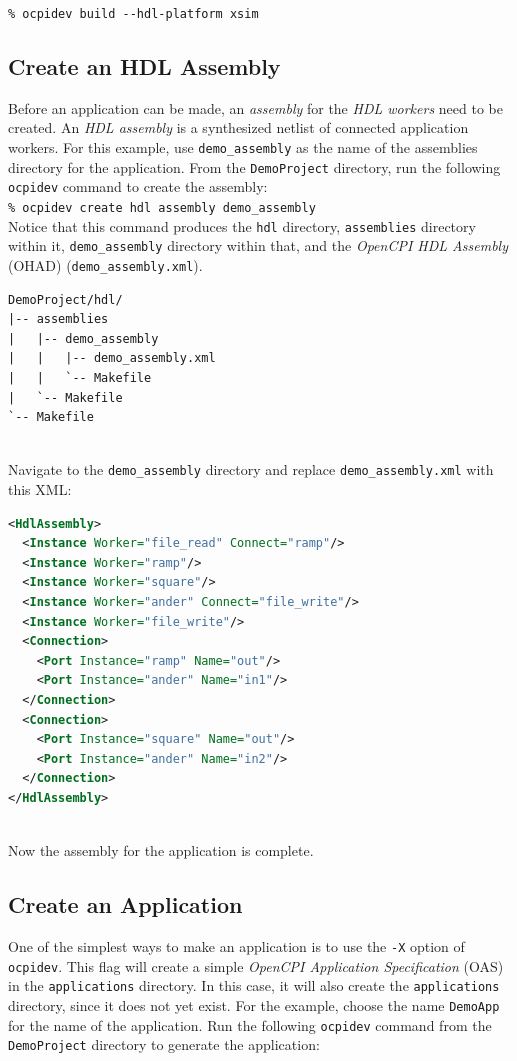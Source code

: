 \forceindent\verb+% ocpidev build --hdl-platform xsim+

\subsection{Create an HDL Assembly}
Before an application can be made, an \textit{assembly} for the \textit{HDL workers} need to be created. An \textit{HDL assembly} is a synthesized netlist of connected application workers. For this example, use \verb+demo_assembly+ as the name of the assemblies directory for the application. From the \verb+DemoProject+ directory, run the following \verb+ocpidev+ command to create the assembly:\\

\forceindent\verb+% ocpidev create hdl assembly demo_assembly+\\
\bstart
Notice that this command produces the \verb+hdl+ directory, \verb+assemblies+ directory within it, \verb+demo_assembly+ directory within that, and the \textit{OpenCPI HDL Assembly} (OHAD) (\verb+demo_assembly.xml+).

\begin{verbatim}
DemoProject/hdl/
|-- assemblies
|   |-- demo_assembly
|   |   |-- demo_assembly.xml
|   |   `-- Makefile
|   `-- Makefile
`-- Makefile
\end{verbatim}
\bend
\pagebreak[1]
~\\
Navigate to the \verb+demo_assembly+ directory and replace \verb+demo_assembly.xml+ with this XML:
\begin{lstlisting}[language=xml]
<HdlAssembly>
  <Instance Worker="file_read" Connect="ramp"/>
  <Instance Worker="ramp"/>
  <Instance Worker="square"/>
  <Instance Worker="ander" Connect="file_write"/>
  <Instance Worker="file_write"/>
  <Connection>
    <Port Instance="ramp" Name="out"/>
    <Port Instance="ander" Name="in1"/>
  </Connection>
  <Connection>
    <Port Instance="square" Name="out"/>
    <Port Instance="ander" Name="in2"/>
  </Connection>
</HdlAssembly>
\end{lstlisting}
~\\
Now the assembly for the application is complete.

\subsection{Create an Application}
One of the simplest ways to make an application is to use the \verb+-X+ option of \verb+ocpidev+. This flag will create a simple \textit{OpenCPI Application Specification} (OAS) in the \verb+applications+ directory. In this case, it will also create the \verb+applications+ directory, since it does not yet exist. For the example, choose the name \verb+DemoApp+ for the name of the application. Run the following \verb+ocpidev+ command from the \verb+DemoProject+ directory to generate the application:\\

